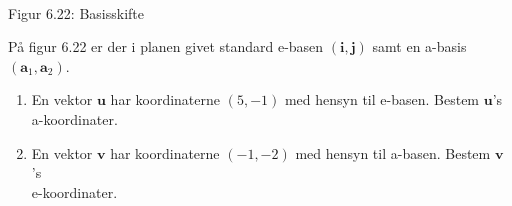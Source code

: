\begin{exercise}\label{tn6.basisskifte}
\begin{center}
		\includegraphics[trim=3cm 11.4cm 4.5cm 10cm,width=0.7,width=0.7\textwidth,clip]{geometer/abasis05.pdf}				
		\\Figur 6.22: Basisskifte
\end{center}
På figur 6.22 er der i planen givet standard e-basen $(\mathbf i, \mathbf j)$ samt en a-basis $(\mathbf a_1, \mathbf a_2)$.
\begin{enumerate}
\item
En vektor $\mathbf u$ har koordinaterne $(5,-1)$ med hensyn til e-basen. Bestem $\mathbf u$'s\\ a-koordinater.
\item
En vektor $\mathbf v$ har koordinaterne $(-1,-2)$ med hensyn til a-basen. Bestem $\mathbf v$'s\\ e-koordinater.
\end{enumerate}
\end{exercise} 
